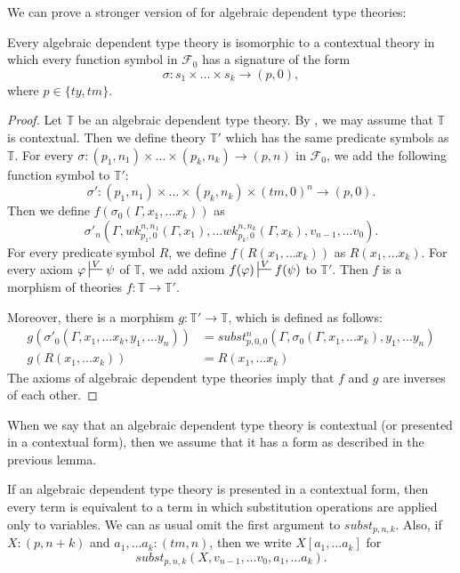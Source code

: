 \documentclass[reqno]{amsart}
\theoremstyle{definition}
\theoremstyle{remark}
\numberwithin{figure}{section}
\begin{document}
We can prove a stronger version of  for algebraic dependent type theories:
\begin{lem}
Every algebraic dependent type theory is isomorphic to a contextual theory in which every function symbol in $\mathcal{F}_0$ has a signature of the form
\[ \sigma : s_1 \times \ldots \times s_k \to (p,0), \]
where $p \in \{ ty,tm \}$.
\end{lem}
\begin{proof}
Let $\mathbb{T}$ be an algebraic dependent type theory.
By , we may assume that $\mathbb{T}$ is contextual.
Then we define theory $\mathbb{T}'$ which has the same predicate symbols as $\mathbb{T}$.
For every $\sigma : (p_1,n_1) \times \ldots \times (p_k,n_k) \to (p,n)$ in $\mathcal{F}_0$, we add the following function symbol to $\mathbb{T}'$:
\[ \sigma' : (p_1,n_1) \times \ldots \times (p_k,n_k) \times (tm,0)^n \to (p,0). \]
Then we define $f(\sigma_0(\Gamma, x_1, \ldots x_k))$ as
\[ \sigma'_n(\Gamma, wk^{n,n_1}_{p_1,0}(\Gamma, x_1), \ldots wk^{n,n_k}_{p_k,0}(\Gamma, x_k), v_{n-1}, \ldots v_0). \]
For every predicate symbol $R$, we define $f(R(x_1, \ldots x_k))$ as $R(x_1, \ldots x_k)$.
For every axiom $\varphi \sststile{}{V} \psi$ of $\mathbb{T}$, we add axiom $f(\varphi) \sststile{}{V} f(\psi)$ to $\mathbb{T}'$.
Then $f$ is a morphism of theories $f : \mathbb{T} \to \mathbb{T}'$.

Moreover, there is a morphism $g : \mathbb{T}' \to \mathbb{T}$, which is defined as follows:
\begin{align*}
g(\sigma'_0(\Gamma, x_1, \ldots x_k, y_1, \ldots y_n)) & = subst^n_{p,0,0}(\Gamma, \sigma_0(\Gamma, x_1, \ldots x_k), y_1, \ldots y_n) \\
g(R(x_1, \ldots x_k)) & = R(x_1, \ldots x_k)
\end{align*}
The axioms of algebraic dependent type theories imply that $f$ and $g$ are inverses of each other.
\end{proof}

When we say that an algebraic dependent type theory is contextual (or presented in a contextual form), then we assume that it has a form as described in the previous lemma.

If an algebraic dependent type theory is presented in a contextual form, then every term is equivalent to a term in which substitution operations are applied only to variables.
We can as usual omit the first argument to $subst_{p,n,k}$.
Also, if $X : (p,n+k)$ and $a_1, \ldots a_k : (tm,n)$, then we write $X[a_1, \ldots a_k]$ for
\[ subst_{p,n,k}(X, v_{n-1}, \ldots v_0, a_1, \ldots a_k). \]
\end{document}
